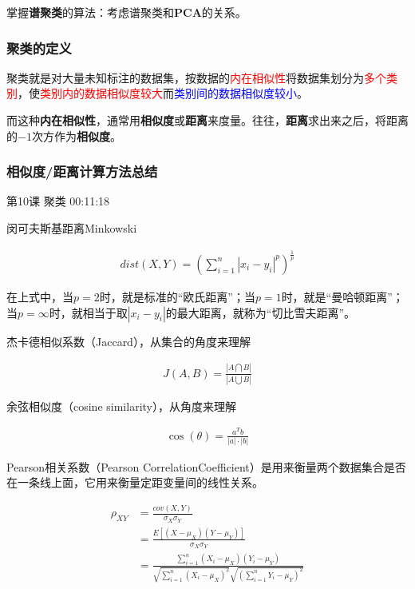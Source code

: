 \documentclass[UTF8]{ctexart}
\begin{document}
掌握\textbf{谱聚类}的算法：考虑谱聚类和\textbf{PCA}的关系。

\subsubsection{聚类的定义}

聚类就是对大量未知标注的数据集，按数据的\textcolor{red}{内在相似性}将数据集划分为\textcolor{red}{多个类别}，使\textcolor{red}{类别内的数据相似度较大}而\textcolor{blue}{类别间的数据相似度较小}。

而这种\textbf{内在相似性}，通常用\textbf{相似度}或\textbf{距离}来度量。往往，\textbf{距离}求出来之后，将距离的$-1$次方作为\textbf{相似度}。

\subsubsection{相似度/距离计算方法总结}

第10课 聚类 00:11:18

闵可夫斯基距离Minkowski

\begin{equation}
\begin{aligned}
dist(X,Y)=\left ( \sum_{i=1}^{n} |x_{i}-y_{i}|^{p} \right )^{\frac{1}{p}}
\end{aligned}
\end{equation}

在上式中，当$p=2$时，就是标准的“欧氏距离”；当$p=1$时，就是“曼哈顿距离”；当$p=\infty$时，就相当于取$|x_{i}-y_{i}|$的最大距离，就称为“切比雪夫距离”。

杰卡德相似系数（Jaccard），从集合的角度来理解

\begin{equation}
\begin{aligned}
J(A,B)=\frac{|A \bigcap B|}{|A \bigcup B|}
\end{aligned}
\end{equation}

余弦相似度（cosine similarity），从角度来理解

\begin{equation}
\begin{aligned}
\cos (\theta)=\frac{a^{T}b}{|a| \cdot |b|}
\end{aligned}
\end{equation}

Pearson相关系数（Pearson CorrelationCoefficient）是用来衡量两个数据集合是否在一条线上面，它用来衡量定距变量间的线性关系。

\begin{equation}
\begin{aligned}
\rho_{XY} &= \frac{cov(X,Y)}{\sigma_{X} \sigma_{Y}} \\
&= \frac{E[(X-\mu_{X})(Y-\mu_{Y})]}{\sigma_{X} \sigma_{Y}}\\
&= \frac{\sum_{i=1}^{n}(X_{i}-\mu_{X})(Y_{i}-\mu_{Y})}{\sqrt{\sum_{i=1}^{n}(X_{i}-\mu_{X})^{2}}\sqrt{(\sum_{i=1}^{n}Y_{i}-\mu_{Y})^{2}}}
\end{aligned}
\end{equation}
\end{document}
